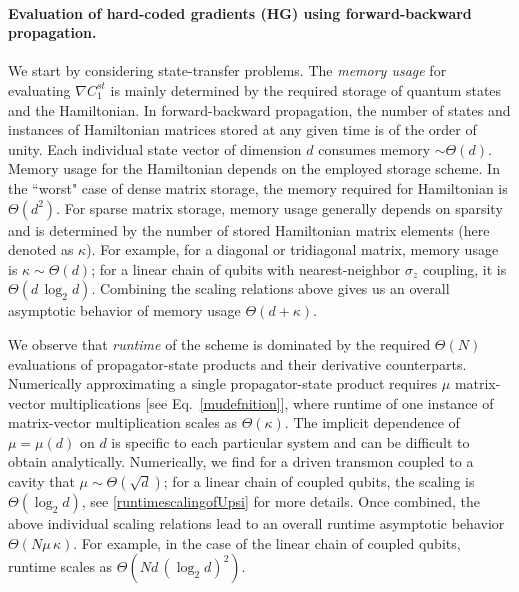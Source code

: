 \documentclass[letterpaper,10pt]{iopart}
\begin{document}

\paragraph{Evaluation of hard-coded gradients (HG) using forward-backward propagation.}
\label{AGscaling}

We start by considering state-transfer problems. The \textit{memory usage} for evaluating $\nabla C_1^{st}$ is mainly determined by the required storage of quantum states and the Hamiltonian. In forward-backward propagation, the number of states and instances of Hamiltonian matrices stored at any given time is of the order of unity. Each individual state vector of dimension $d$ consumes memory $\sim\Theta(d)$. Memory usage for the Hamiltonian depends on the employed storage scheme. In the ``worst" case of dense matrix storage, the memory required for Hamiltonian is $\Theta(d^2)$. For sparse matrix storage, memory usage generally depends on sparsity and is determined by the number of stored Hamiltonian matrix elements (here denoted as $\kappa$). For example, for a diagonal or tridiagonal matrix, memory usage is $\kappa\sim\Theta(d)$; for a linear chain of qubits with nearest-neighbor $\sigma_z$ coupling, it is $\Theta(d\, \log_2 d)$. Combining the scaling relations above gives us an overall asymptotic behavior of memory usage $\Theta(d+\kappa)$.

We observe that \textit{runtime} of the scheme is dominated by the required $\Theta(N)$ evaluations of propagator-state products and their derivative counterparts. Numerically approximating a single propagator-state product requires $\mu$ matrix-vector multiplications [see Eq.\ \eqref{mudefnition}], where runtime of one instance of matrix-vector multiplication scales as $\Theta(\kappa)$.  The implicit dependence of $\mu=\mu(d)$ on $d$ is specific to each particular system and can be difficult to obtain analytically. Numerically, we find for a driven transmon coupled to a cavity that $\mu\sim\Theta(\sqrt{d})$; for a linear chain of coupled qubits, the scaling is $\Theta(\log_2 d)$, see  \ref{runtimescalingofUpsi} for more details. 
Once combined, the above individual scaling relations lead to an overall runtime asymptotic behavior 
$\Theta(N\mu\, \kappa)$. For example, in the case of the linear chain of coupled qubits, runtime scales as $\Theta(Nd\, (\log_2 d )^2)$.
\end{document}
